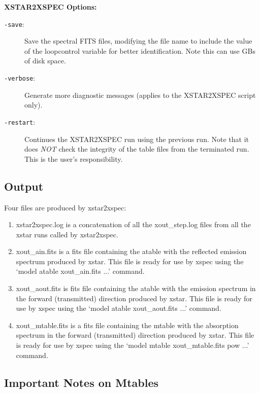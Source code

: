 {\bf XSTAR2XSPEC Options:}

\begin{description}

	\item[{\tt -save}:]   Save the spectral FITS files, modifying the file name to
    include the value of the loopcontrol variable for better
    identification.  Note this can use GBs of disk space.
    
	\item[{\tt -verbose}:]   Generate more diagnostic messages (applies 
	to the XSTAR2XSPEC script only).

	\item[{\tt -restart}:]  Continues the XSTAR2XSPEC run using the previous run.
    Note that it does {\it NOT} check the integrity of the table files from the 
    terminated run.  This is the user's responsibility.
\end{description}

\subsection{Output}

Four files are produced by xstar2xspec:

\begin{enumerate}
	\item xstar2xspec.log is a concatenation of all the xout\_step.log
	files from all the xstar runs called by xstar2xspec.

	\item xout\_ain.fits is a fits file containing the atable with the reflected 
	emission spectrum produced by xstar.  This file is ready for use by xspec
	using the `model atable xout\_ain.fits ...' command.

	\item xout\_aout.fits is fits file containing the atable with the
	emission spectrum in the forward (transmitted) direction 
	produced by xstar.  This file is ready for use by xspec
	using the `model atable xout\_aout.fits ...' command.

	\item xout\_mtable.fits is a fits file containing the mtable with the 
	absorption spectrum in the forward (transmitted) direction
	produced by xstar.  This file is ready for use by xspec
	using the `model mtable xout\_mtable.fits pow ...' command.

\end{enumerate}

\subsection{Important Notes on Mtables}

